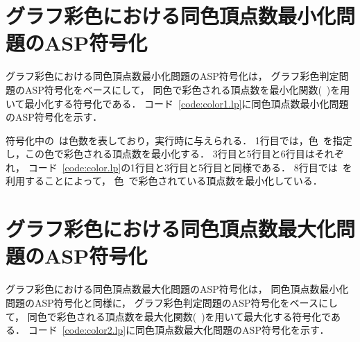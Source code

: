 \section{グラフ彩色における同色頂点数最小化問題のASP符号化}



グラフ彩色における同色頂点数最小化問題のASP符号化は，
グラフ彩色判定問題のASP符号化をベースにして，
同色で彩色される頂点数を最小化関数(~)を用いて最小化する符号化である．
コード~\ref{code:color1.lp}に同色頂点数最小化問題のASP符号化を示す．

符号化中の~は色数を表しており，実行時に与えられる．
1行目では，色~を指定し，この色で彩色される頂点数を最小化する．
3行目と5行目と6行目はそれぞれ，
コード~\ref{code:color.lp}の1行目と3行目と5行目と同様である．
8行目では~を利用することによって，
色~で彩色されている頂点数を最小化している．

\section{グラフ彩色における同色頂点数最大化問題のASP符号化}



グラフ彩色における同色頂点数最大化問題のASP符号化は，
同色頂点数最小化問題のASP符号化と同様に，
グラフ彩色判定問題のASP符号化をベースにして，
同色で彩色される頂点数を最大化関数(~)を用いて最大化する符号化である．
コード~\ref{code:color2.lp}に同色頂点数最大化問題のASP符号化を示す．

